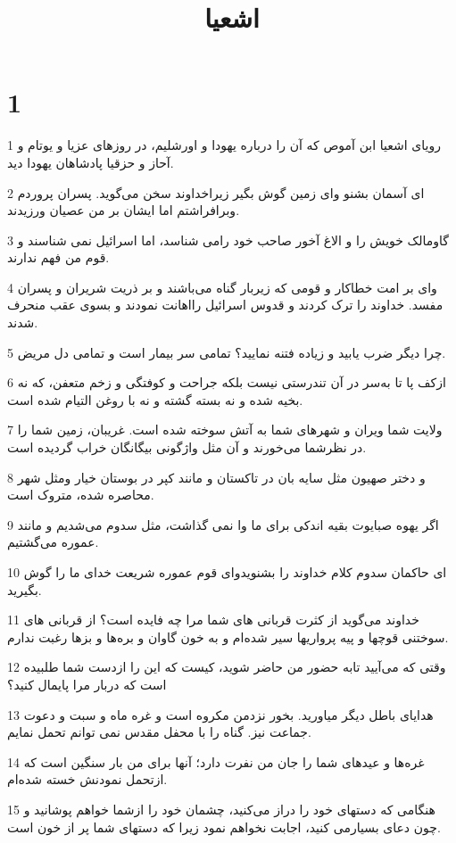 

\title{اشعيا}

 
\chapter{1}

\par 1 رویای اشعیا ابن آموص که آن را درباره یهودا و اورشلیم، در روزهای عزیا و یوتام و آحاز و حزقیا پادشاهان یهودا دید.
\par 2 ‌ای آسمان بشنو و‌ای زمین گوش بگیر زیراخداوند سخن می‌گوید. پسران پروردم وبرافراشتم اما ایشان بر من عصیان ورزیدند.
\par 3 گاومالک خویش را و الاغ آخور صاحب خود رامی شناسد، اما اسرائیل نمی شناسند و قوم من فهم ندارند.
\par 4 وای بر امت خطاکار و قومی که زیربار گناه می‌باشند و بر ذریت شریران و پسران مفسد. خداوند را ترک کردند و قدوس اسرائیل رااهانت نمودند و بسوی عقب منحرف شدند.
\par 5 چرا دیگر ضرب یابید و زیاده فتنه نمایید؟ تمامی سر بیمار است و تمامی دل مریض.
\par 6 ازکف پا تا به‌سر در آن تندرستی نیست بلکه جراحت و کوفتگی و زخم متعفن، که نه بخیه شده و نه بسته گشته و نه با روغن التیام شده است.
\par 7 ولایت شما ویران و شهرهای شما به آتش سوخته شده است. غریبان، زمین شما را در نظرشما می‌خورند و آن مثل واژگونی بیگانگان خراب گردیده است.
\par 8 و دختر صهیون مثل سایه بان در تاکستان و مانند کپر در بوستان خیار ومثل شهر محاصره شده، متروک است.
\par 9 اگر یهوه صبایوت بقیه اندکی برای ما وا نمی گذاشت، مثل سدوم می‌شدیم و مانند عموره می‌گشتیم.
\par 10 ‌ای حاکمان سدوم کلام خداوند را بشنویدو‌ای قوم عموره شریعت خدای ما را گوش بگیرید.
\par 11 خداوند می‌گوید از کثرت قربانی های شما مرا چه فایده است؟ از قربانی های سوختنی قوچها و پیه پرواریها سیر شده‌ام و به خون گاوان و بره‌ها و بزها رغبت ندارم.
\par 12 وقتی که می‌آیید تابه حضور من حاضر شوید، کیست که این را ازدست شما طلبیده است که دربار مرا پایمال کنید؟
\par 13 هدایای باطل دیگر میاورید. بخور نزدمن مکروه است و غره ماه و سبت و دعوت جماعت نیز. گناه را با محفل مقدس نمی توانم تحمل نمایم.
\par 14 غره‌ها و عیدهای شما را جان من نفرت دارد؛ آنها برای من بار سنگین است که ازتحمل نمودنش خسته شده‌ام.
\par 15 هنگامی که دستهای خود را دراز می‌کنید، چشمان خود را ازشما خواهم پوشانید و چون دعای بسیارمی کنید، اجابت نخواهم نمود زیرا که دستهای شما پر از خون است.

